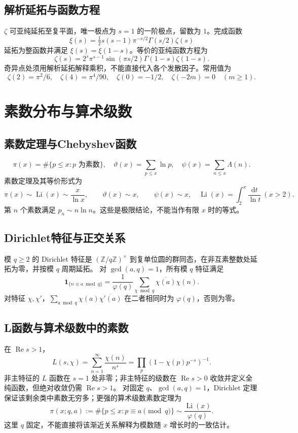 \documentclass[../main.tex]{subfiles}
\begin{document}
\subsection{解析延拓与函数方程}
$\zeta$ 可亚纯延拓至复平面，唯一极点为 $s=1$ 的一阶极点，留数为 $1$。完成函数
\[
\xi(s)=\tfrac12s(s-1)\pi^{-s/2}\Gamma(s/2)\zeta(s)
\]
延拓为整函数并满足 $\xi(s)=\xi(1-s)$。等价的亚纯函数方程为
\[
\zeta(s)=2^s\pi^{s-1}\sin(\pi s/2)\Gamma(1-s)\zeta(1-s).
\]
奇异点处须用解析延拓解释乘积，不能直接代入各个发散因子。常用值为
\[
\zeta(2)=\pi^2/6,\quad\zeta(4)=\pi^4/90,\quad\zeta(0)=-1/2,\quad
\zeta(-2m)=0\quad(m\ge1).
\]
\section{素数分布与算术级数}
\subsection{素数定理与Chebyshev函数}
\[
\pi(x)=\#\{p\le x:p\text{ 为素数}\},\quad
\vartheta(x)=\sum_{p\le x}\ln p,\quad\psi(x)=\sum_{n\le x}\Lambda(n).
\]
素数定理及其等价形式为
\[
\pi(x)\sim\operatorname{Li}(x)\sim\frac x{\ln x},\qquad
\vartheta(x)\sim x,\qquad\psi(x)\sim x,
\quad \operatorname{Li}(x)=\int_2^x\frac{\mathrm dt}{\ln t}\ (x>2).
\]
第 $n$ 个素数满足 $p_n\sim n\ln n$。这些是极限结论，不能当作有限 $x$ 时的等式。
\subsection{Dirichlet特征与正交关系}
模 $q\ge2$ 的 Dirichlet 特征是 $(\mathbb Z/q\mathbb Z)^\times$ 到复单位圆的群同态，在非互素整数处延拓为零，并按模 $q$ 周期延拓。
对 $\gcd(a,q)=1$，所有模 $q$ 特征满足
\[
\bm1_{\{n\equiv a\bmod q\}}=
\frac1{\varphi(q)}\sum_{\chi\bmod q}\overline{\chi(a)}\chi(n).
\]
对特征 $\chi,\chi'$，$\sum_{a\bmod q}\chi(a)\overline{\chi'(a)}$ 在二者相同时为 $\varphi(q)$，否则为零。
\par\begin{samepage}
\subsection{L函数与算术级数中的素数}
在 $\operatorname{Re}s>1$，
\[
L(s,\chi)=\sum_{n=1}^\infty\frac{\chi(n)}{n^s}
=\prod_p(1-\chi(p)p^{-s})^{-1}.
\]
非主特征的 $L$ 函数在 $s=1$ 处非零；非主特征的级数在 $\operatorname{Re}s>0$ 收敛并定义全纯函数，但绝对收敛仍需 $\operatorname{Re}s>1$。
对固定 $q$、$\gcd(a,q)=1$，Dirichlet 定理保证该剩余类中素数无穷多；更强的算术级数素数定理为
\[
\pi(x;q,a):=\#\{p\le x:p\equiv a\pmod q\}
\sim\frac{\operatorname{Li}(x)}{\varphi(q)}.
\]
这里 $q$ 固定，不能直接将该渐近关系解释为模数随 $x$ 增长时的一致估计。
\par\end{samepage}
\end{document}
